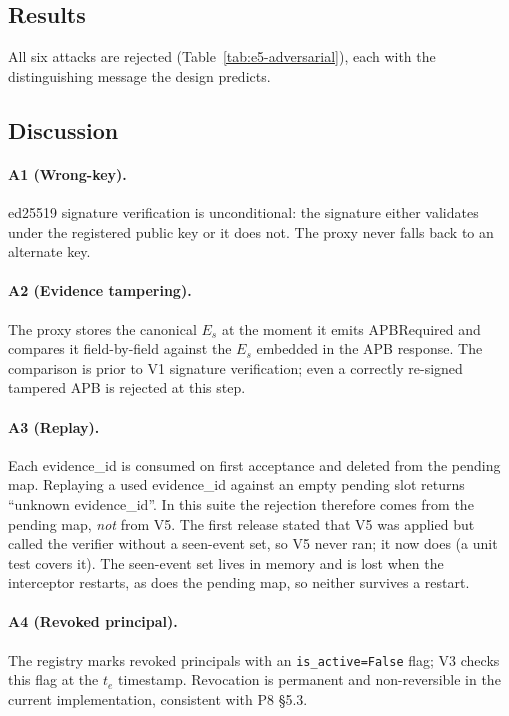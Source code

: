 \documentclass[11pt]{article}
\newcommand{\Es}{E_s}
\begin{document}
\subsection{Results}



\noindent
All six attacks are rejected (Table~\ref{tab:e5-adversarial}), each with
the distinguishing message the design predicts.

\subsection{Discussion}

\paragraph{A1 (Wrong-key).}
ed25519 signature verification is unconditional: the signature either
validates under the registered public key or it does not.
The proxy never falls back to an alternate key.

\paragraph{A2 (Evidence tampering).}
The proxy stores the canonical $\Es$ at the moment it emits APBRequired
and compares it field-by-field against the $\Es$ embedded in the APB response.
The comparison is prior to V1 signature verification; even a correctly
re-signed tampered APB is rejected at this step.

\paragraph{A3 (Replay).}
Each evidence\_id is consumed on first acceptance and deleted from the
pending map.
Replaying a used evidence\_id against an empty pending slot returns
``unknown evidence\_id''. In this suite the rejection therefore comes
from the pending map, \emph{not} from V5. The first release stated that
V5 was applied but called the verifier without a seen-event set, so V5
never ran; it now does (a unit test covers it). The seen-event set lives in
memory and is lost when the interceptor restarts, as does the pending
map, so neither survives a restart.

\paragraph{A4 (Revoked principal).}
The registry marks revoked principals with an \texttt{is\_active=False}
flag; V3 checks this flag at the $t_e$ timestamp.
Revocation is permanent and non-reversible in the current implementation,
consistent with P8 §5.3.
\end{document}
